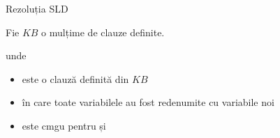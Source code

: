\documentclass[xcolor=pdftex,romanian,colorlinks]{beamer}
\begin{document}
\begin{frame}{Rezoluția SLD}
 
\vspace{.2cm}
Fie $KB$ o mulțime de clauze definite.

\medskip
\begin{center}

\end{center}
\vspace{-.2cm}
unde 
\begin{itemize}
	\item {} este o clauză definită din $KB$
	
	\item în care toate variabilele au fost redenumite cu variabile noi

	\item \intens{ $\theta$} este cmgu pentru  și 

\end{itemize}
\end{frame}
\end{document}
